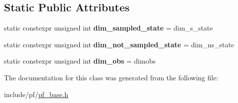 \subsection*{Static Public Attributes}
\begin{DoxyCompactItemize}
\item 
\mbox{\label{classrbpf__base_af21cee7552f48dad09dda4b78b5d230f}} 
static constexpr unsigned int {\bfseries dim\+\_\+sampled\+\_\+state} = dim\+\_\+s\+\_\+state
\item 
\mbox{\label{classrbpf__base_a1f1c86754e10faeac9e7e0af66cda4fe}} 
static constexpr unsigned int {\bfseries dim\+\_\+not\+\_\+sampled\+\_\+state} = dim\+\_\+ns\+\_\+state
\item 
\mbox{\label{classrbpf__base_a31e4567dbc293bdb292520cf76a6f2da}} 
static constexpr unsigned int {\bfseries dim\+\_\+obs} = dimobs
\end{DoxyCompactItemize}


The documentation for this class was generated from the following file\+:\begin{DoxyCompactItemize}
\item 
include/pf/\hyperlink{pf__base_8h}{pf\+\_\+base.\+h}\end{DoxyCompactItemize}
